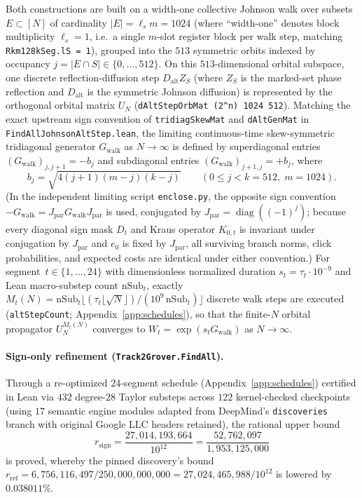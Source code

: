 \documentclass[11pt,a4paper]{article}
\theoremstyle{definition}
\theoremstyle{remark}
\begin{document}
Both constructions are built on a width-one collective Johnson walk over subsets \(E \subset [N]\) of cardinality \(|E| = \ell_s m = 1024\) (where ``width-one'' denotes block multiplicity \(\ell_s = 1\), i.e.\ a single \(m\)-slot register block per walk step, matching \texttt{Rkm128kSeg.lS = 1}), grouped into the \(513\) symmetric orbits indexed by occupancy \(j = |E \cap S| \in \{0, \dots, 512\}\). On this \(513\)-dimensional orbital subspace, one discrete reflection-diffusion step \(D_{\mathrm{alt}} Z_S\) (where \(Z_S\) is the marked-set phase reflection and \(D_{\mathrm{alt}}\) is the symmetric Johnson diffusion) is represented by the orthogonal orbital matrix \(U_N\) (\texttt{dAltStepOrbMat (2\^{}n) 1024 512}). Matching the exact upstream sign convention of \texttt{tridiagSkewMat} and \texttt{dAltGenMat} in \texttt{FindAllJohnsonAltStep.lean}, the limiting continuous-time skew-symmetric tridiagonal generator \(G_{\mathrm{walk}}\) as \(N \to \infty\) is defined by superdiagonal entries \((G_{\mathrm{walk}})_{j,j+1} = -b_j\) and subdiagonal entries \((G_{\mathrm{walk}})_{j+1,j} = +b_j\), where
\[
  b_j = \sqrt{4(j+1)(m-j)(k-j)} \qquad (0 \le j < k = 512,\; m = 1024).
\]
(In the independent limiting script \texttt{enclose.py}, the opposite sign convention \(-G_{\mathrm{walk}} = J_{\mathrm{par}} G_{\mathrm{walk}} J_{\mathrm{par}}\) is used, conjugated by \(J_{\mathrm{par}} = \operatorname{diag}((-1)^j)\); because every diagonal sign mask \(D_t\) and Kraus operator \(K_{0,t}\) is invariant under conjugation by \(J_{\mathrm{par}}\) and \(e_0\) is fixed by \(J_{\mathrm{par}}\), all surviving branch norms, click probabilities, and expected costs are identical under either convention.) For segment~\(t \in \{1, \dots, 24\}\) with dimensionless normalized duration \(s_t = \tau_t \cdot 10^{-9}\) and Lean macro-substep count \(\mathrm{nSub}_t\), exactly \(M_t(N) = \mathrm{nSub}_t \lfloor (\tau_t \lfloor\sqrt{N}\rfloor)/(10^9\,\mathrm{nSub}_t)\rfloor\) discrete walk steps are executed (\texttt{altStepCount}; Appendix~\ref{app:schedules}), so that the finite-\(N\) orbital propagator \(U_N^{M_t(N)}\) converges to \(W_t = \exp(s_t G_{\mathrm{walk}})\) as \(N \to \infty\).

\paragraph{Sign-only refinement (\texttt{Track2Grover.FindAll}).}
Through a re-optimized \(24\)-segment schedule (Appendix~\ref{app:schedules}) certified in Lean via \(432\) degree-\(28\) Taylor substeps across \(122\) kernel-checked checkpoints (using \(17\) semantic engine modules adapted from DeepMind's \texttt{discoveries} branch with original Google LLC headers retained), the rational upper bound
\[
  r_{\mathrm{sign}} = \frac{27{,}014{,}193{,}664}{10^{12}} = \frac{52{,}762{,}097}{1{,}953{,}125{,}000}
\]
is proved, whereby the pinned discovery's bound \(r_{\mathrm{ref}} = 6{,}756{,}116{,}497\allowbreak/250{,}000{,}000{,}000 = 27{,}024{,}465{,}988\allowbreak/10^{12}\) is lowered by \(0.038011\%\).
\end{document}
